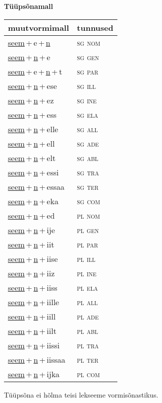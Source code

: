 
\vspace{1.8em}
\begin{minipage}{\textwidth}
\textbf{Tüüpsõnamall \,}\\

\begin{sideways}
\begin{tabular}{l l}
muutvormimall & tunnused \\
\hline
\underline{seem}\,+\,e\,+\,\underline{n} & \textsc{ sg nom } \\
\underline{seem}\,+\,\underline{n}\,+\,e & \textsc{ sg gen } \\
\underline{seem}\,+\,e\,+\,\underline{n}\,+\,t & \textsc{ sg par } \\
\underline{seem}\,+\,\underline{n}\,+\,ese & \textsc{ sg ill } \\
\underline{seem}\,+\,\underline{n}\,+\,ez & \textsc{ sg ine } \\
\underline{seem}\,+\,\underline{n}\,+\,ess & \textsc{ sg ela } \\
\underline{seem}\,+\,\underline{n}\,+\,elle & \textsc{ sg all } \\
\underline{seem}\,+\,\underline{n}\,+\,ell & \textsc{ sg ade } \\
\underline{seem}\,+\,\underline{n}\,+\,elt & \textsc{ sg abl } \\
\underline{seem}\,+\,\underline{n}\,+\,essi & \textsc{ sg tra } \\
\underline{seem}\,+\,\underline{n}\,+\,essaa & \textsc{ sg ter } \\
\underline{seem}\,+\,\underline{n}\,+\,eka & \textsc{ sg com } \\
\underline{seem}\,+\,\underline{n}\,+\,ed & \textsc{ pl nom } \\
\underline{seem}\,+\,\underline{n}\,+\,ije & \textsc{ pl gen } \\
\underline{seem}\,+\,\underline{n}\,+\,iit & \textsc{ pl par } \\
\underline{seem}\,+\,\underline{n}\,+\,iise & \textsc{ pl ill } \\
\underline{seem}\,+\,\underline{n}\,+\,iiz & \textsc{ pl ine } \\
\underline{seem}\,+\,\underline{n}\,+\,iiss & \textsc{ pl ela } \\
\underline{seem}\,+\,\underline{n}\,+\,iille & \textsc{ pl all } \\
\underline{seem}\,+\,\underline{n}\,+\,iill & \textsc{ pl ade } \\
\underline{seem}\,+\,\underline{n}\,+\,iilt & \textsc{ pl abl } \\
\underline{seem}\,+\,\underline{n}\,+\,iissi & \textsc{ pl tra } \\
\underline{seem}\,+\,\underline{n}\,+\,iissaa & \textsc{ pl ter } \\
\underline{seem}\,+\,\underline{n}\,+\,ijka & \textsc{ pl com } \\
\end{tabular}
\end{sideways}
\label{tab:tüüpsõnamall-seemen}

\end{minipage}

 
\vspace{1em}
\noindent Tüüpsõna ei hõlma teisi lekseeme vormi\-sõnastikus.
